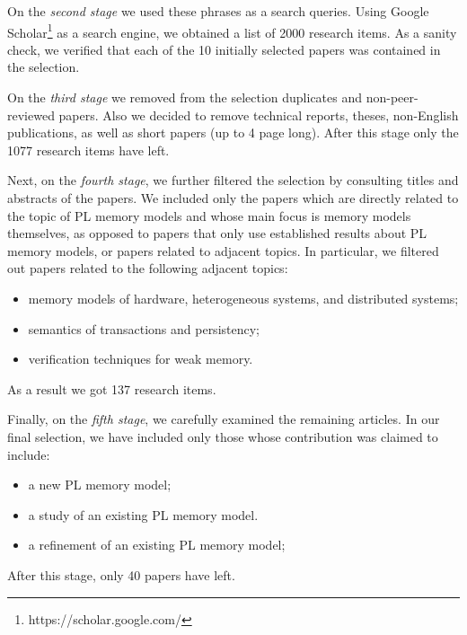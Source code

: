 On the \emph{second stage} we used these phrases as a search queries. 
Using Google Scholar\footnote{https://scholar.google.com/} as a search engine, 
we obtained a list of 2000 research items. 
As a sanity check, we verified that each of the 10 initially selected papers 
was contained in the selection. 

On the \emph{third stage} we removed from the selection duplicates and non-peer-reviewed papers. 
Also we decided to remove technical reports, theses, 
non-English publications, as well as short papers (up to 4 page long).
After this stage only the 1077 research items have left.

Next, on the \emph{fourth stage}, we further filtered the selection 
by consulting titles and abstracts of the papers. 
We included only the papers which are directly related to the 
topic of PL memory models and whose main focus is memory models themselves,
as opposed to papers that only use established results about PL memory models,
or papers related to adjacent topics. 
In particular, we filtered out papers related to the following adjacent topics:
\begin{itemize}
  \item memory models of hardware, heterogeneous systems, and distributed systems;
  \item semantics of transactions and persistency;
  \item verification techniques for weak memory.
\end{itemize}
As a result we got 137 research items.

Finally, on the \emph{fifth stage}, we carefully examined the remaining articles.
In our final selection, we have included only those whose contribution was claimed to include:
\begin{itemize}
  \item a new PL memory model;
  \item a study of an existing PL memory model.
  \item a refinement of an existing PL memory model;
\end{itemize}
After this stage, only 40 papers have left.

